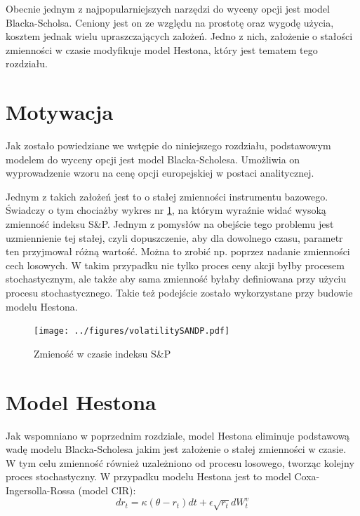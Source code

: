 \documentclass{pracamgr}
\begin{document}
Obecnie jednym z najpopularniejszych narzędzi do wyceny opcji jest model Blacka-Scholsa. Ceniony jest on ze względu na prostotę oraz wygodę użycia, kosztem jednak wielu upraszczających założeń. 
Jedno z nich, założenie o stałości zmienności w czasie modyfikuje model Hestona, który jest 
tematem tego rozdziału.


\section{Motywacja} 
Jak zostało powiedziane we wstępie do niniejszego rozdziału, podstawowym modelem do wyceny opcji jest model Blacka-Scholesa.
Umożliwia on wyprowadzenie wzoru na cenę opcji europejskiej w postaci analitycznej. 

Jednym z takich założeń jest to o stałej zmienności instrumentu bazowego. Świadczy o tym chociażby
wykres nr \ref{fig:vix}, na którym wyraźnie widać wysoką zmienność indeksu S\&P. Jednym z pomysłów na obejście tego problemu jest uzmiennienie tej stałej, czyli dopuszczenie, aby dla dowolnego czasu, parametr ten przyjmował różną wartość. Można to zrobić np. poprzez nadanie zmienności cech losowych. W takim przypadku nie tylko proces ceny akcji byłby procesem stochastycznym, ale także aby sama zmienność byłaby definiowana przy użyciu procesu stochastycznego. Takie też podejście zostało wykorzystane przy budowie modelu Hestona. \cite{greenwade93}



\begin{figure}
  \centering  
  \texttt{[image: ../figures/volatilitySANDP.pdf]}
  \caption{Zmieność w czasie indeksu S\&P}\label{fig:vix}
\end{figure} 

\section{Model Hestona}
Jak wspomniano w poprzednim rozdziale, model Hestona eliminuje podstawową wadę modelu Blacka-Scholesa jakim jest założenie o stałej zmienności w czasie.
W tym celu zmienność również uzależniono od procesu losowego, tworząc kolejny proces stochastyczny. W przypadku modelu Hestona jest to model Coxa-Ingersolla-Rossa (model CIR):
\begin{equation}
dr_t  = \kappa (\theta  - r_t)dt + \epsilon \sqrt{r_t} dW_t^v 
\end{equation}
\end{document}

